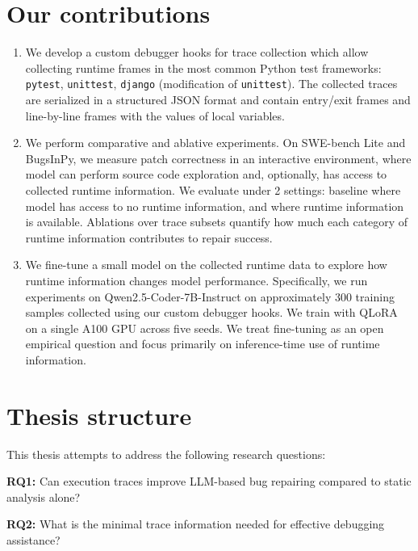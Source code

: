 \section{Our contributions}
\begin{enumerate}
  \item We develop a custom debugger hooks for trace collection which 
      allow collecting runtime frames in the most common Python test frameworks: \texttt{pytest}, \texttt{unittest}, \texttt{django} (modification of \texttt{unittest}).
      The collected traces are serialized in a structured JSON format and contain entry/exit frames
        and line-by-line frames with the values of local variables.
  \item We perform comparative and ablative experiments. On SWE-bench Lite and BugsInPy, we
    measure patch correctness in an interactive environment, where model can perform source code exploration and, optionally,
    has access to collected runtime information.
    We evaluate under 2 settings: baseline where model has access to no runtime information, and where runtime information is available.
    Ablations over trace subsets quantify how much each category of runtime information contributes to repair success.
  \item We fine-tune a small model on the collected runtime data to explore how runtime information changes model performance.
      Specifically, we run experiments on Qwen2.5-Coder-7B-Instruct on approximately 300 training samples
      collected using our custom debugger hooks. We train with QLoRA on a single A100 GPU across five seeds.
      We treat fine-tuning as an open empirical question and focus primarily on inference-time use of runtime information.
\end{enumerate}

\section{Thesis structure}
This thesis attempts to address the following research questions:

\begin{tcolorbox}[colback=blue!6!white,colframe=blue!60!black,boxrule=0.6pt,arc=2pt,left=6pt,right=6pt,top=4pt,bottom=4pt]
\textbf{RQ1:} Can execution traces improve LLM-based bug repairing compared to static analysis alone?
\end{tcolorbox}

\begin{tcolorbox}[colback=green!6!white,colframe=green!50!black,boxrule=0.6pt,arc=2pt,left=6pt,right=6pt,top=4pt,bottom=4pt]
\textbf{RQ2:} What is the minimal trace information needed for effective debugging assistance?
\end{tcolorbox}

